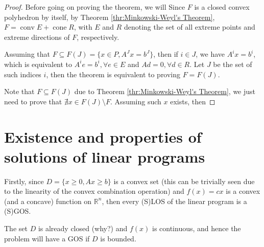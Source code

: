 \begin{proof}
  Before going on proving the theorem, we will 
  Since \( F \) is a closed convex polyhedron by itself, by
  Theorem \ref{thr:Minkowski-Weyl's Theorem}, \( F =
  \operatorname{conv} E + \operatorname{cone} R \),
  with \( E \) and \( R \) denoting the set of all
  extreme points and extreme directions of \( F \), respectively.

  Assuming that \( F \subseteq F(J) = \{ x \in P, A^{J}x = b^{J}\}   \), then if
  \( i \in J \), we have \( A^{i}x = b^{i} \), which is equivalent to \( A^{i}e
  = b^{i}, \forall e \in E\) and \( Ad = 0, \forall d \in R \). Let \( J \) be
  the set of such indices \( i \), then the theorem is equivalent to proving \(
  F = F(J)\).

  Note that \( F \subseteq F(J) \) due to Theorem \ref{thr:Minkowski-Weyl's
  Theorem}, we just need to prove that \( \nexists x \in F(J) \setminus
  F\). Assuming such \( x \) exists, then
\end{proof}




\section{Existence and properties of solutions of linear programs} %
\label{sec:Existence and properties of solutions of linear programs}

Firstly, since \( D = \{x\ge 0, Ax \ge  b\}   \) is a convex set (this can be
trivially seen due to the linearity of the convex combination operation) and \(
f(x)=cx\) is a convex (and a concave) function on \( \mathbb{R}^{n} \), then
every (S)LOS of the linear program is a (S)GOS.

The set \( D \) is already closed (why?) and \( f(x) \) is continuous, and hence
the problem will have a GOS if \( D \) is bounded.



